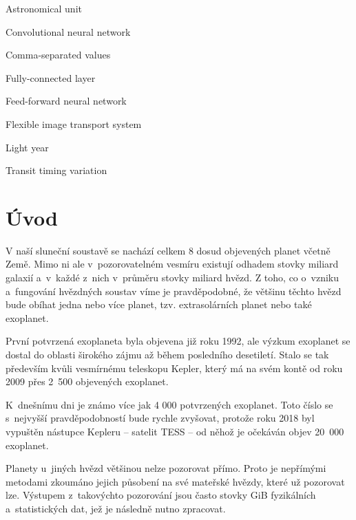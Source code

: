 \documentclass[a4paper,12pt]{article}
\begin{document}
\deskpage
\mainpage
\assignment
\statement
\acknowledgment
\annotationcs	
\annotationen
\content
\imglist
\tablelist
\codelist
\formulalist
\shortlist

\begin{description}[font=\mdseries,leftmargin=6em,labelwidth=!,]
\item[au]		Astronomical unit
\item[CNN]      Convolutional neural network
\item[csv]      Comma-separated values
\item[FC]       Fully-connected layer
\item[FFNN]     Feed-forward neural network
\item[fits]     Flexible image transport system
\item[ly]		Light year
\item[TTV]		Transit timing variation
\end{description}

\clearpage\pagestyle{plain}
\section*{Úvod}
\label{uvod}

V naší sluneční soustavě se nachází celkem 8 dosud objevených planet včetně Země. Mimo ni ale v~pozorovatelném vesmíru existují odhadem stovky miliard galaxií a~v~každé z~nich v~průměru stovky miliard hvězd. Z toho, co o~vzniku a~fungování hvězdných soustav víme je pravděpodobné, že většinu těchto hvězd bude obíhat jedna nebo více planet, tzv. extrasolárních planet nebo také exoplanet.~\cite{exoplanets}

První potvrzená exoplaneta byla objevena již roku 1992, ale výzkum exoplanet se dostal do oblasti širokého zájmu až během posledního desetiletí. Stalo se tak především kvůli vesmírnému teleskopu Kepler, který má na svém kontě od roku 2009 přes 2~500 objevených exoplanet.~\cite{kepler80,nasadata}

K~dnešnímu dni je známo více jak 4 000 potvrzených exoplanet. Toto číslo se s~nejvyšší pravděpodobností bude rychle zvyšovat, protože roku 2018 byl vypuštěn nástupce Kepleru -- satelit TESS -- od něhož je očekáván objev 20~000 exoplanet.~\cite{tess}

Planety u~jiných hvězd většinou nelze pozorovat přímo. Proto je nepřímými metodami zkoumáno jejich působení na své mateřské hvězdy, které už pozorovat lze. Výstupem z~takovýchto pozorování jsou často stovky GiB fyzikálních a~statistických dat, jež je následně nutno zpracovat.~\cite{exoplanets}
\end{document}
